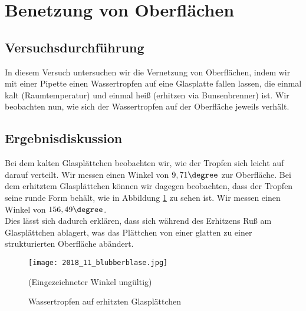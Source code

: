 \documentclass{scrartcl}
\begin{document}
\newpage
\section{Benetzung von Oberflächen}
\subsection{Versuchsdurchführung}
In diesem Versuch untersuchen wir die Vernetzung von Oberflächen, indem wir mit einer Pipette einen Wassertropfen auf eine Glasplatte fallen lassen,  die einmal kalt (Raumtemperatur) und einmal heiß (erhitzen via Bunsenbrenner) ist.
Wir beobachten nun, wie sich der Wassertropfen auf der Oberfläche jeweils verhält. 

\subsection{Ergebnisdiskussion}
Bei dem kalten Glasplättchen beobachten wir, wie der Tropfen sich leicht auf darauf verteilt. Wir messen einen Winkel von $9,71\degree$ zur Oberfläche.
Bei dem erhitztem Glasplättchen können wir dagegen beobachten, dass der Tropfen seine runde Form behält, wie in Abbildung \ref{fig:V4} zu sehen ist. Wir messen einen Winkel von $156,49\degree$.\\
Dies lässt sich dadurch erklären, dass sich während des Erhitzens Ruß am Glasplättchen ablagert, was das Plättchen von einer glatten zu einer strukturierten Oberfläche abändert.  
\begin{figure}[H]
  \centering
    \texttt{[image: 2018\_11\_blubberblase.jpg]}
  \caption{Wassertropfen auf erhitzten Glasplättchen}
  (Eingezeichneter Winkel ungültig)
  \label{fig:V4}
\end{figure}
\end{document}
